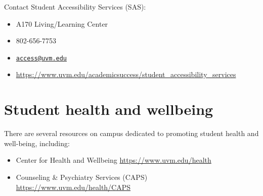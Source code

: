 \documentclass[12pt,]{article}
\providecommand{\tightlist}{%
  \setlength{\itemsep}{0pt}\setlength{\parskip}{0pt}}
\begin{document}
Contact Student Accessibility Services (SAS):

\begin{itemize}
\tightlist
\item
  A170 Living/Learning Center
\item
  802-656-7753
\item
  \href{mailto:access@uvm.edu}{\nolinkurl{access@uvm.edu}}
\item
  \url{https://www.uvm.edu/academicsuccess/student_accessibility_services}
\end{itemize}

\section{Student health and
wellbeing}\label{student-health-and-wellbeing}

There are several resources on campus dedicated to promoting student
health and well-being, including:

\begin{itemize}
\item
  Center for Health and Wellbeing \url{https://www.uvm.edu/health}
\item
  Counseling \& Psychiatry Services (CAPS)
  \url{https://www.uvm.edu/health/CAPS}
\end{itemize}
\end{document}
